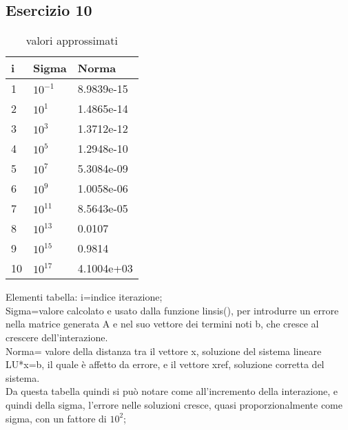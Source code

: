 \subsection{Esercizio 10}

\begin{table}[h]
\begin{tabular}{|l l l|}
        \hline
        i & Sigma  &  Norma\\
        \hline
        1 & $10^{-1}$  &  8.9839e-15\\
        2 & $10^{1}$ &  1.4865e-14 \\
        3 & $10^{3}$ &  1.3712e-12 \\
        4 & $10^{5}$ &  1.2948e-10 \\
        5 & $10^{7}$ &  5.3084e-09 \\
        6 & $10^{9}$ &  1.0058e-06 \\
        7 & $10^{11}$ &  8.5643e-05 \\
        8 & $10^{13}$ &  0.0107 \\
        9 & $10^{15}$ &  0.9814 \\
        10 & $10^{17}$ & 4.1004e+03\\
        \hline
\end{tabular}
\caption{valori approssimati}
\label{tab::1}     
\end{table}
Elementi tabella:
	i=indice iterazione;\\
	Sigma=valore calcolato e usato dalla funzione linsis(), per introdurre un errore nella matrice generata A e nel suo vettore dei termini noti b, che cresce al crescere dell'interazione.\\
	Norma= valore della distanza tra il vettore x, soluzione del sistema lineare LU*x=b, il quale è affetto da errore, e il vettore xref, soluzione corretta del sistema.\\
Da questa tabella quindi si può notare come all'incremento della interazione, e quindi della sigma, l'errore nelle soluzioni  cresce, quasi proporzionalmente come sigma, con un fattore di $10^{2}$;
